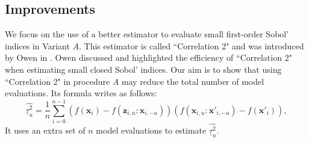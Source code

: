 \documentclass[]{elsarticle}
\theoremstyle{definition}
\newcommand{\bvec}[1]{\boldsymbol{#1}}
\newcommand{\vx}{\bvec{x}}
\newcommand{\vz}{\bvec{z}}
\begin{document}
\subsection{Improvements}

We focus on the use of a better estimator to evaluate small first-order Sobol' indices in Variant $A$. This estimator is called ``Correlation 2" and was introduced by Owen in \cite{Owen}. Owen discussed and highlighted the efficiency of ``Correlation 2" when estimating small closed Sobol' indices. Our aim is to show that using ``Correlation 2" in procedure $A$ may reduce the total number of model evaluations. Its formula writes as follows:
\begin{equation}
\widehat{\underline{\tau}_u^2} = \frac{1}{n} \sum \limits_{i=0}^{n-1} (f(\vx_i)-f({\vz}_{i,u}:{\vx}_{i,-u}))(f(\vx_{i,u}:{\vx'}_{i,-u})-f({\vx'}_i)),
\label{correlation2}
\end{equation}
It uses an extra set of $n$ model evaluations to estimate $\widehat{\underline{\tau}_u^2}$. %
\bigskip
\end{document}
